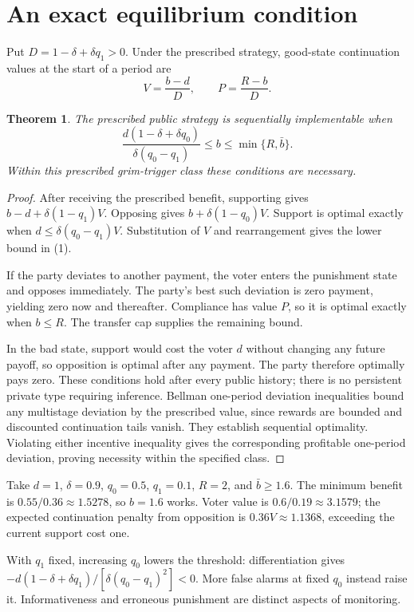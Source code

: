 \documentclass[11pt,a4paper]{article}
\newtheorem{theorem}{Theorem}[section]
\begin{document}
\section{An exact equilibrium condition}
Put $D=1-\delta+\delta q_1>0$. Under the prescribed strategy, good-state continuation values at the start of a period are
\[
 V=\frac{b-d}{D},\qquad P=\frac{R-b}{D}.
\]
\begin{theorem}
The prescribed public strategy is sequentially implementable when
\[
 \frac{d(1-\delta+\delta q_0)}{\delta(q_0-q_1)}
 \le b\le\min\{R,\bar b\}.
 \tag{1}
\]
Within this prescribed grim-trigger class these conditions are necessary.
\end{theorem}
\begin{proof}
After receiving the prescribed benefit, supporting gives $b-d+\delta(1-q_1)V$. Opposing gives $b+\delta(1-q_0)V$. Support is optimal exactly when
$d\le\delta(q_0-q_1)V$.
Substitution of $V$ and rearrangement gives the lower bound in (1).

If the party deviates to another payment, the voter enters the punishment state and opposes immediately. The party's best such deviation is zero payment, yielding zero now and thereafter. Compliance has value $P$, so it is optimal exactly when $b\le R$. The transfer cap supplies the remaining bound.

In the bad state, support would cost the voter $d$ without changing any future payoff, so opposition is optimal after any payment. The party therefore optimally pays zero. These conditions hold after every public history; there is no persistent private type requiring inference. Bellman one-period deviation inequalities bound any multistage deviation by the prescribed value, since rewards are bounded and discounted continuation tails vanish. They establish sequential optimality. Violating either incentive inequality gives the corresponding profitable one-period deviation, proving necessity within the specified class.
\end{proof}
Take $d=1$, $\delta=0.9$, $q_0=0.5$, $q_1=0.1$, $R=2$, and $\bar b\ge1.6$. The minimum benefit is $0.55/0.36\approx1.5278$, so $b=1.6$ works. Voter value is $0.6/0.19\approx3.1579$; the expected continuation penalty from opposition is $0.36V\approx1.1368$, exceeding the current support cost one.

With $q_1$ fixed, increasing $q_0$ lowers the threshold: differentiation gives
$-d(1-\delta+\delta q_1)/[\delta(q_0-q_1)^2]<0$.
More false alarms at fixed $q_0$ instead raise it. Informativeness and erroneous punishment are distinct aspects of monitoring.
\end{document}
